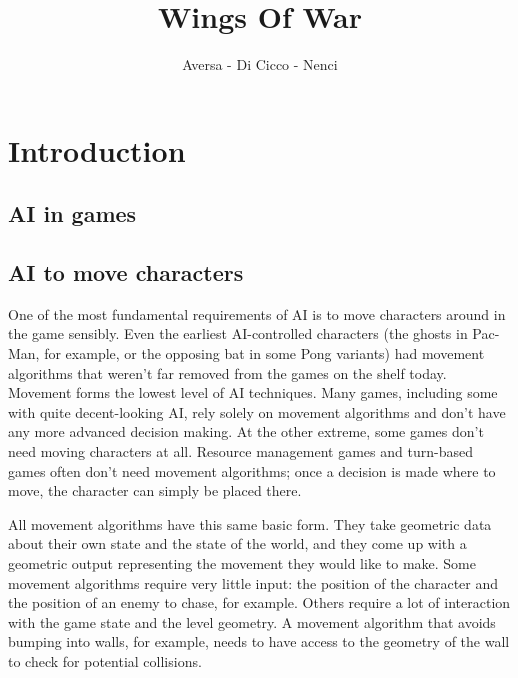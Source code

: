 \documentclass[12pt]{report}
\title{Wings Of War}
\author{Aversa - Di Cicco - Nenci}
\begin{document}
\maketitle
\tableofcontents
\chapter{Introduction}

\section{AI in games}

\section{AI to move characters}
One of the most fundamental requirements of AI is to move characters around in the game sensibly. Even the earliest AI-controlled characters (the ghosts in Pac-Man, for example, or the opposing bat in some Pong variants) had movement algorithms that weren’t far removed from the games on the shelf today. Movement forms the lowest level of AI techniques. Many games, including some with quite decent-looking AI, rely solely on movement algorithms and don’t have any more advanced decision making. At the other extreme, some games don’t need moving characters at all. Resource management games and turn-based games often don’t need movement algorithms; once a decision is made where to move, the character can simply be placed there.

All movement algorithms have this same basic form. They take geometric data about their
own state and the state of the world, and they come up with a geometric output representing the movement they would like to make.
Some movement algorithms require very little input: the position of the character and the
position of an enemy to chase, for example. Others require a lot of interaction with the game
state and the level geometry. A movement algorithm that avoids bumping into walls, for example, needs to have access to the geometry of the wall to check for potential collisions.
\end{document}
